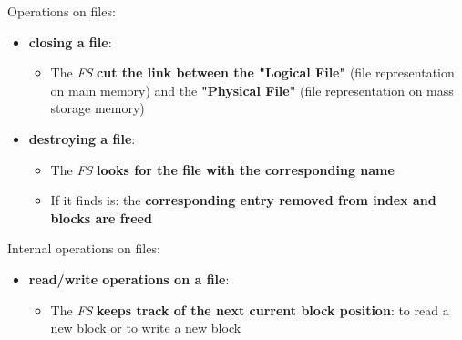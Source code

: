 \documentclass{beamer}[10pt, usepdftitle=false, handout]
\begin{document}
{	\begin{frame}
		Operations on files:	
		\vspace*{0.5em}
		\begin{itemize}
		\item{\textbf{closing a file}: 
		\begin{itemize}
			\item{The \textit{FS} \textbf{cut the link between the "Logical File"} (file representation on main memory) and the \textbf{"Physical File"} (file representation on mass storage memory)}
		\end{itemize}	
					}
		\item{\textbf{destroying a file}: 
		\begin{itemize}
			\item{The \textit{FS} \textbf{looks for the file with the corresponding name}}
			\item{If it finds is: the \textbf{corresponding entry removed from index and blocks are freed}}		
		\end{itemize}	
					}
		\end{itemize}
		\vspace*{1em}
		Internal operations on files:	
		\vspace*{0.5em}
		\begin{itemize}
		\item{\textbf{read/write operations on a file}: 
		\begin{itemize}
			\item{The \textit{FS} \textbf{keeps track of the next current block position}: to read a new block or to write a new block}
		\end{itemize}	
					}
		\end{itemize}
		
	\end{frame} 
	
}
\end{document}

